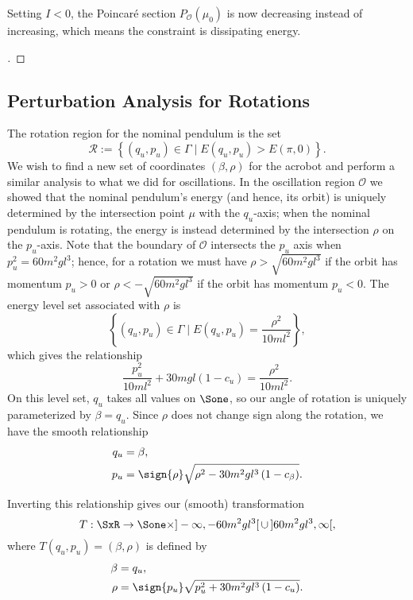 Setting \(I < 0\), the Poincar\'{e} section \(P_\mathcal{O}(\mu_0)\) is now
decreasing instead of increasing,
which means the constraint is dissipating energy.

\begin{proof}[\unskip\nopunct]
\end{proof}

\subsection*{Perturbation Analysis for Rotations}
The rotation region for the nominal pendulum is the set
\[
    \mathcal{R} := \left\{ (q_u,p_u) \in \Gamma \mid E(q_u,p_u) > E(\pi,0)\right\}
    .
\]
We wish to find a new set of coordinates \((\beta,\rho)\) for the acrobot
and perform a similar analysis to what we did for oscillations.
In the oscillation region \(\mathcal{O}\) we showed that the nominal pendulum's
energy (and hence, its orbit) is uniquely determined by the intersection point
\(\mu\) with the \(q_u\)-axis; 
when the nominal pendulum is rotating, the energy is instead determined by the
intersection \(\rho\) on the \(p_u\)-axis.
Note that the boundary of \(\mathcal{O}\) intersects the \(p_u\) axis when 
\(p_u^2 = 60m^2 g l^3\); 
hence, for a rotation we must have \(\rho > \sqrt{60 m^2 g l^3}\) if the
orbit has momentum \(p_u > 0\) 
or \(\rho < -\sqrt{60 m^2 g l^3}\) if the orbit has momentum \(p_u < 0\).
The energy level set associated with \(\rho\) is
\[
    \left\{(q_u,p_u) \in \Gamma \mid E(q_u,p_u) = \frac{\rho^2}{10ml^2}\right\}
    ,
\]
which gives the relationship
\begin{equation}\label{eqn:rotation-pu2}
    \frac{p_u^2}{10m l^2} + 30mgl(1 - c_u) = \frac{\rho^2}{10 ml^2}
    .
\end{equation}
On this level set, \(q_u\) takes all values on \(\Sone\), so our angle of
rotation is uniquely parameterized by \(\beta = q_u\).
Since \(\rho\) does not change sign along the rotation, we have the smooth
relationship
\begin{align}\label{eqn:rotation-Tinv}
    q_u &= \beta
    , \\
    p_u &= \sign{\rho}\sqrt{\rho^2 - 30 m^2 g l^3\left(1 - c_\beta \right)}
    .
\end{align}

Inverting this relationship gives our (smooth) transformation
\begin{equation*}
    T : \SxR \rightarrow 
    \Sone \times ]-\infty,-60m^2gl^3[\, \cup \, ]60m^2gl^3,\infty[ 
    ,
\end{equation*}
where \(T(q_u,p_u) = (\beta,\rho)\) is defined by
\begin{align}\label{eqn:rotation-T}
    \beta &= q_u
    , \\
    \rho &= \sign{p_u}\sqrt{p_u^2 + 30 m^2 g l^3 \left(1 - c_u \right)}
    .
\end{align}

